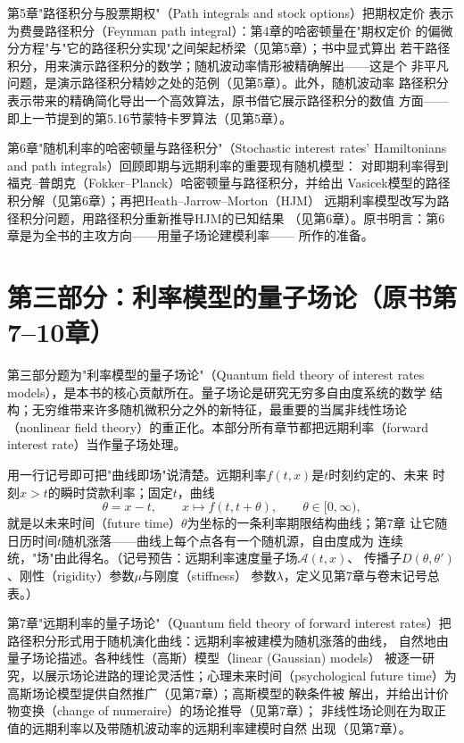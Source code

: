 第5章"路径积分与股票期权"（Path integrals and stock options）把期权定价
表示为费曼路径积分（Feynman path integral）：第4章的哈密顿量在"期权定价
的偏微分方程"与"它的路径积分实现"之间架起桥梁（见第5章）；书中显式算出
若干路径积分，用来演示路径积分的数学；随机波动率情形被精确解出——这是个
非平凡问题，是演示路径积分精妙之处的范例（见第5章）。此外，随机波动率
路径积分表示带来的精确简化导出一个高效算法，原书借它展示路径积分的数值
方面——即上一节提到的第5.16节蒙特卡罗算法（见第5章）。

第6章"随机利率的哈密顿量与路径积分"（Stochastic interest rates'
Hamiltonians and path integrals）回顾即期与远期利率的重要现有随机模型：
对即期利率得到福克--普朗克（Fokker--Planck）哈密顿量与路径积分，并给出
Vasicek模型的路径积分解（见第6章）；再把Heath--Jarrow--Morton（HJM）
远期利率模型改写为路径积分问题，用路径积分重新推导HJM的已知结果
（见第6章）。原书明言：第6章是为全书的主攻方向——用量子场论建模利率——
所作的准备。

\section{第三部分：利率模型的量子场论（原书第7--10章）}

第三部分题为"利率模型的量子场论"（Quantum field theory of interest rates
models），是本书的核心贡献所在。量子场论是研究无穷多自由度系统的数学
结构；无穷维带来许多随机微积分之外的新特征，最重要的当属非线性场论
（nonlinear field theory）的重正化。本部分所有章节都把远期利率（forward
interest rate）当作量子场处理。

用一行记号即可把"曲线即场"说清楚。远期利率$f(t,x)$是$t$时刻约定的、未来
时刻$x>t$的瞬时贷款利率；固定$t$，曲线
\begin{equation*}
\theta=x-t,\qquad x\mapsto f(t,t+\theta),\qquad \theta\in[0,\infty),
\end{equation*}
就是以未来时间（future time）$\theta$为坐标的一条利率期限结构曲线；第7章
让它随日历时间$t$随机涨落——曲线上每个点各有一个随机源，自由度成为
连续统，"场"由此得名。（记号预告：远期利率速度量子场$\mathcal{A}(t,x)$、
传播子$D(\theta,\theta')$、刚性（rigidity）参数$\mu$与刚度（stiffness）
参数$\lambda$，定义见第7章与卷末记号总表。）

第7章"远期利率的量子场论"（Quantum field theory of forward interest
rates）把路径积分形式用于随机演化曲线：远期利率被建模为随机涨落的曲线，
自然地由量子场论描述。各种线性（高斯）模型（linear (Gaussian) models）
被逐一研究，以展示场论进路的理论灵活性；心理未来时间（psychological
future time）为高斯场论模型提供自然推广（见第7章）；高斯模型的鞅条件被
解出，并给出计价物变换（change of numeraire）的场论推导（见第7章）；
非线性场论则在为取正值的远期利率以及带随机波动率的远期利率建模时自然
出现（见第7章）。

